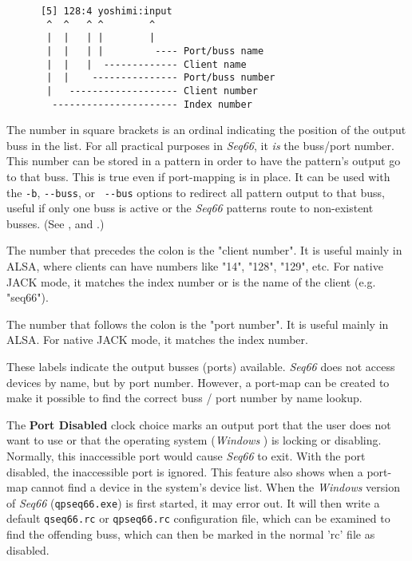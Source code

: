    \begin{verbatim}
      [5] 128:4 yoshimi:input
       ^  ^   ^ ^        ^
       |  |   | |        |
       |  |   | |         ---- Port/buss name
       |  |   |  ------------- Client name
       |  |    --------------- Port/buss number
       |   ------------------- Client number
        ---------------------- Index number
   \end{verbatim}

   \setcounter{ItemCounter}{0}      %

   The number in square brackets is an ordinal indicating the position
   of the output buss in the list.
   For all practical purposes in \textsl{Seq66}, it \textsl{is} the
   buss/port number.  This number can be stored in a pattern in order to have
   the pattern's output go to that buss.  
   This is true even if port-mapping is in place.
   It can be used with the \texttt{-b},
   \texttt{-{}-buss}, or \texttt{ -{}-bus} options to redirect all
   pattern output to that buss, useful if only one buss is active or the
   \textsl{Seq66} patterns route to non-existent busses.
   (See ,
   and .)

   The number that precedes the colon is the "client number".
   It is useful mainly in ALSA, where clients can have numbers like "14",
   "128", "129", etc.  For native JACK mode, it matches the index number or is
   the name of the client (e.g. "seq66").

   The number that follows the colon is the "port number".
   It is useful mainly in ALSA.
   For native JACK mode, it matches the index number.

   These labels indicate the output busses (ports) available.
   \textsl{Seq66} does not access devices by name, but by port number.
   However, a port-map can be created to make it possible to find the correct
   buss / port number by name lookup.

   The \textbf{Port Disabled} clock choice marks an output port
   that the user does not want to use or that the operating system
   (\textsl{Windows} \smiley)
   is locking or disabling.
   Normally, this inaccessible port would cause \textsl{Seq66} to exit.
   With the port disabled, the inaccessible port is ignored.
   This feature also shows when a port-map cannot find a device in the system's
   device list.
   When the \textsl{Windows} version of \textsl{Seq66}
   (\texttt{qpseq66.exe}) is first started, it may error out.
   It will then write a default \texttt{qseq66.rc}
   or \texttt{qpseq66.rc} configuration file,
   which can be examined to find the offending buss, which can then be
   marked in the normal 'rc' file as disabled.

